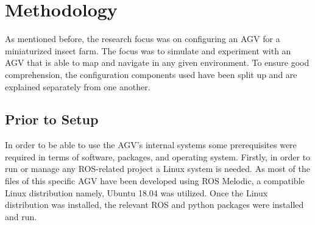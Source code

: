 \section{Methodology}\label{methodology}


As mentioned before, the research focus was on configuring an AGV for a miniaturized insect farm. The focus was to simulate and experiment with an AGV that is able to map and navigate in any given environment. To ensure good comprehension, the configuration components used have been split up and are explained separately from one another.

\subsection{Prior to Setup}
In order to be able to use the AGV's internal systems some prerequisites were required in terms of software, packages, and operating system. Firstly, in order to run or manage any ROS-related project a Linux system is needed. As most of the files of this specific AGV have been developed using ROS Melodic, a compatible Linux distribution namely, Ubuntu 18.04 was utilized. 
Once the Linux distribution was installed, the relevant ROS and python packages were installed and run.

